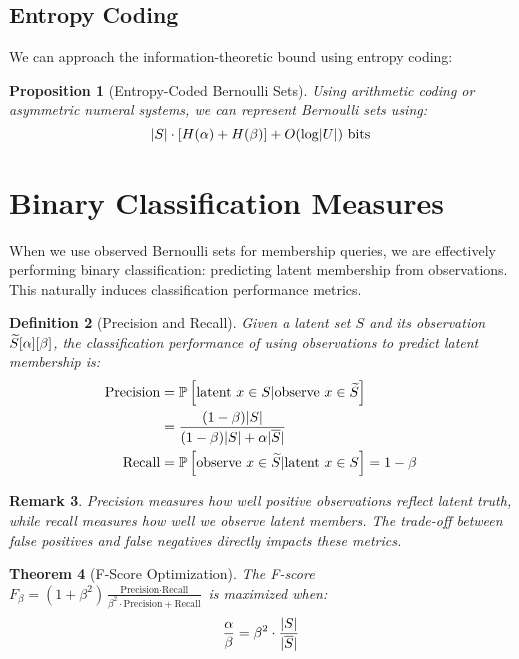\documentclass[11pt,final,hidelinks]{article}
\newtheorem{theorem}{Theorem}[section]
\newtheorem{proposition}[theorem]{Proposition}
\newtheorem{definition}[theorem]{Definition}
\newtheorem{remark}[theorem]{Remark}
\begin{document}
\subsection{Entropy Coding}

We can approach the information-theoretic bound using entropy coding:

\begin{proposition}[Entropy-Coded Bernoulli Sets]
Using arithmetic coding or asymmetric numeral systems, we can represent Bernoulli sets using:
\begin{equation}
\lvert S\rvert \cdot [H(\alpha) + H(\beta)] + O(\log \lvert U\rvert) \text{ bits}
\end{equation}
\end{proposition}

\section{Binary Classification Measures}

When we use observed Bernoulli sets for membership queries, we are effectively performing binary classification: predicting latent membership from observations. This naturally induces classification performance metrics.

\begin{definition}[Precision and Recall]
Given a latent set $S$ and its observation $\widetilde{S}[\alpha][\beta]$, the classification performance of using observations to predict latent membership is:
\begin{align}
\text{Precision} &= \mathbb{P}\left[\text{latent } x \in S | \text{observe } x \in \widetilde{S}\right] \\
&= \frac{(1-\beta)\lvert S\rvert}{(1-\beta)\lvert S\rvert + \alpha\lvert\overline{S}\rvert} \\
\text{Recall} &= \mathbb{P}\left[\text{observe } x \in \widetilde{S} | \text{latent } x \in S\right] = 1 - \beta
\end{align}
\end{definition}

\begin{remark}
Precision measures how well positive observations reflect latent truth, while recall measures how well we observe latent members. The trade-off between false positives and false negatives directly impacts these metrics.
\end{remark}

\begin{theorem}[F-Score Optimization]
The F-score $F_\beta = (1+\beta^2) \frac{\text{Precision} \cdot \text{Recall}}{\beta^2 \cdot \text{Precision} + \text{Recall}}$ is maximized when:
\begin{equation}
\frac{\alpha}{\beta} = \beta^2 \cdot \frac{\lvert S\rvert}{\lvert\overline{S}\rvert}
\end{equation}
\end{theorem}
\end{document}
